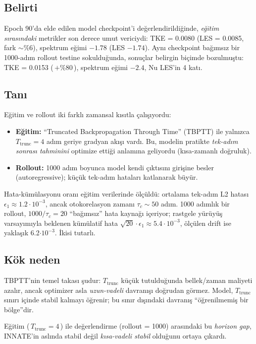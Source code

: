 \subsection*{Belirti}

Epoch 90'da elde edilen model checkpoint'i değerlendirildiğinde, \textit{eğitim sırasındaki} metrikler son derece umut vericiydi: TKE = 0.0080 (LES = 0.0085, fark $\sim \%6$), spektrum eğimi $-1.78$ (LES $-1.74$). Aynı checkpoint bağımsız bir 1000-adım rollout testine sokulduğunda, sonuçlar belirgin biçimde bozulmuştu: TKE = 0.0153 (\,$+\%80$\,), spektrum eğimi $-2.4$, Nu LES'in 4 katı.

\subsection*{Tanı}

Eğitim ve rollout iki farklı zamansal kısıtla çalışıyordu:
\begin{itemize}
    \item \textbf{Eğitim:} ``Truncated Backpropagation Through Time'' (TBPTT) ile yalnızca $T_{\text{trunc}} = 4$ adım geriye gradyan akışı vardı. Bu, modelin pratikte \textit{tek-adım sonrası tahminini} optimize ettiği anlamına geliyordu (kısa-zamanlı doğruluk).
    \item \textbf{Rollout:} 1000 adım boyunca model kendi çıktısını girişine besler (autoregressive); küçük tek-adım hataları katlanarak büyür.
\end{itemize}

Hata-kümülasyonu oranı eğitim verilerinde ölçüldü: ortalama tek-adım L2 hatası $\epsilon_1 \approx 1.2 \cdot 10^{-3}$, ancak otokorelasyon zamanı $\tau_c \sim 50$ adım. 1000 adımlık bir rollout, $1000 / \tau_c = 20$ ``bağımsız'' hata kaynağı içeriyor; rastgele yürüyüş varsayımıyla beklenen kümülatif hata $\sqrt{20} \cdot \epsilon_1 \approx 5.4 \cdot 10^{-3}$, ölçülen drift ise yaklaşık 6.2$\cdot 10^{-3}$. İkisi tutarlı.

\subsection*{Kök neden}

TBPTT'nin temel takası şudur: $T_{\text{trunc}}$ küçük tutulduğunda bellek/zaman maliyeti azalır, ancak optimizer asla \textit{uzun-vadeli} davranışı doğrudan görmez. Model, $T_{\text{trunc}}$ sınırı içinde stabil kalmayı öğrenir; bu sınır dışındaki davranış ``öğrenilmemiş bir bölge''dir.

Eğitim (\,$T_{\text{trunc}} = 4$\,) ile değerlendirme (rollout = 1000) arasındaki bu \textit{horizon gap}, INNATE'in aslında stabil değil \textit{kısa-vadeli stabil} olduğunu ortaya çıkardı.

